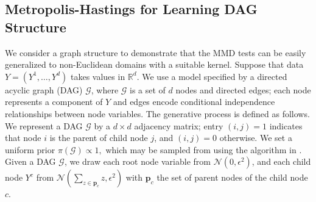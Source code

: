 \documentclass{article}
\begin{document}
\subsection{Metropolis-Hastings for Learning DAG Structure} \label{sec:graphexp}
We consider a graph structure to demonstrate that the MMD tests can be easily generalized to non-Euclidean domains with a suitable kernel.
Suppose that data $Y=(Y^1, \dots, Y^d)$ takes values in $\mathbb{R}^d.$ 
We use a model specified by a directed acyclic graph (DAG) $\mathcal{G}$, where 
$\mathcal{G}$ is a set of $d$ nodes and directed edges; 
each node represents a component of $Y$ and edges encode conditional independence relationships between node variables. 
The generative process is defined as follows. 
We represent a DAG $\mathcal{G}$ by a $d\times d$ adjacency matrix; entry $(i,j)=1$ indicates that node $i$ is the parent of child node $j$, and $(i,j)=0$ otherwise. 
We set a uniform prior $\pi(\mathcal{G}) \propto 1,$ which may be sampled from using the algorithm in \cite{kuipers_uniform_2015}. 
Given a DAG $\mathcal{G}$, we draw each root node variable from $\mathcal{N}(0, \epsilon^2)$, and each child node $Y^{c}$ from $\mathcal{N}(\sum_{z \in \mathbf{p}_c} z, \epsilon^2)$ with $\mathbf{p}_c$ the set of parent nodes of the child node $c.$ 
\end{document}
